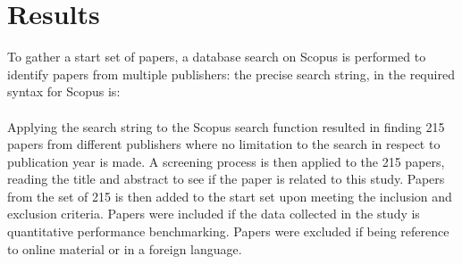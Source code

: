 \section{Results}
To gather a start set of papers, a database search on Scopus \cite{scopus} is performed to identify papers from multiple publishers: the precise search string, in the required syntax for Scopus is: \\

{}\\

Applying the search string to the Scopus search function resulted in finding 215 papers from different publishers where no limitation to the search in respect to publication year is made. A screening process is then applied to the 215 papers, reading the title and abstract to see if the paper is related to this study. Papers from the set of 215 is then added to the start set upon meeting the inclusion and exclusion criteria. Papers were included if the data collected in the study is quantitative performance benchmarking. Papers were excluded if being reference to online material or in a foreign language.\\

